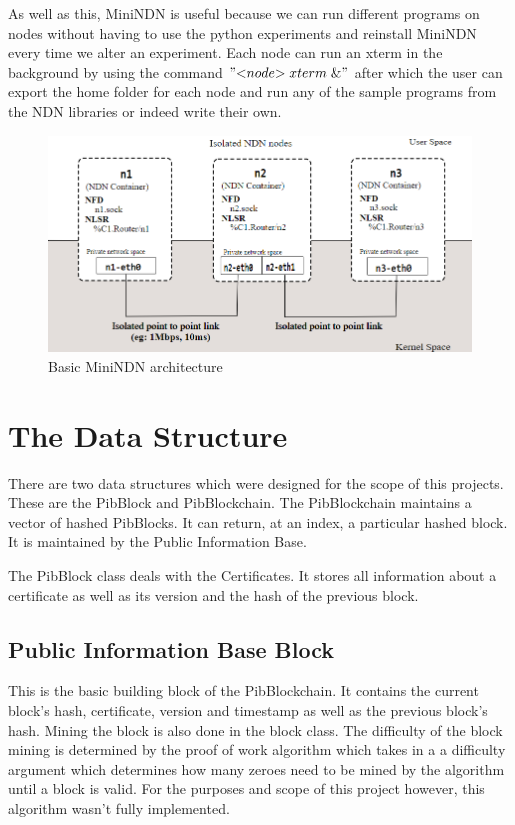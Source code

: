 As well as this, MiniNDN is useful because we can run different programs on nodes without having to use the python experiments and reinstall MiniNDN every time we alter an experiment. Each node can run an xterm in the background by using the command $"{<}node{>} \; xterm \; \& "$ after which the user can export the home folder for each node and run any of the sample programs from the NDN libraries or indeed write their own. 
\begin{figure}

\includegraphics[width=6in]{minindn}
\caption{Basic MiniNDN architecture}
\end{figure}

\section{The Data Structure}
There are two data structures which were designed for the scope of this projects. These are the PibBlock and PibBlockchain. The PibBlockchain maintains a vector of hashed PibBlocks. It can return, at an index, a particular hashed block. It is maintained by the Public Information Base. 

The PibBlock class deals with the Certificates. It stores all information about a certificate as well as its version and the hash of the previous block.
\subsection{Public Information Base Block}
This is the basic building block of the PibBlockchain. It contains the current block's hash, certificate, version and timestamp as well as the previous block's hash. Mining the block is also done in the block class. The difficulty of the block mining is determined by the proof of work algorithm which takes in a a difficulty argument which determines how many zeroes need to be mined by the algorithm until a block is valid. For the purposes and scope of this project however, this algorithm wasn't fully implemented. 

